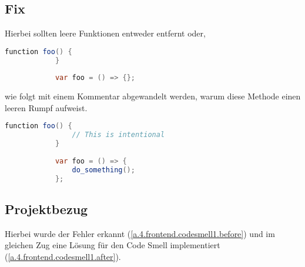 		\subsection{Fix}
		Hierbei sollten leere Funktionen entweder entfernt oder,
		\begin{lstlisting}[language=java,caption={Non Compliant Version - Codesmell 3},gobble=11]
			function foo() {
			}
			
			var foo = () => {};
		\end{lstlisting}
		
		wie folgt mit einem Kommentar abgewandelt werden, warum diese Methode einen leeren Rumpf aufweist.
		
		\begin{lstlisting}[language=java,caption={Compliant Version - Codesmell 3},gobble=11]
			function foo() {
				// This is intentional
			}
			
			var foo = () => {
				do_something();
			};
		\end{lstlisting}
		
		\subsection{Projektbezug}
		Hierbei wurde der Fehler erkannt (\cref{a.4.frontend.codesmell1.before}) und im gleichen Zug eine Lösung für den Code Smell implementiert (\cref{a.4.frontend.codesmell1.after}).
